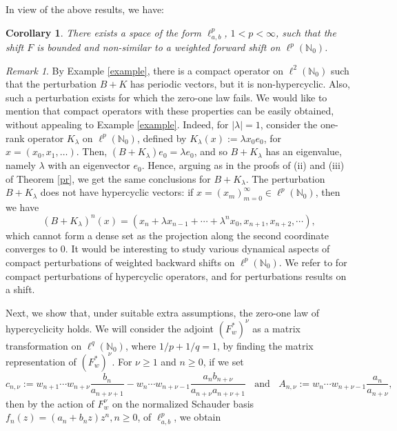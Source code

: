 \documentclass[12pt, reqno]{amsart}
\newtheorem{corollary}[theorem]{Corollary}
\theoremstyle{definition}
\theoremstyle{remark}
\newtheorem{remark}[theorem]{Remark}
\numberwithin{equation}{section}
\begin{document}
In view of the above results, we have:

\begin{corollary}
There exists a space of the form $\ell^p_{a,b}$, $1<p<\infty$, such that the shift $F$ is bounded and non-similar to a weighted forward shift on $\ell^p(\mathbb{N}_0)$.
\end{corollary}


 \begin{remark}
      By Example \ref{example}, there is a compact operator on $\ell^2(\mathbb{N}_{0})$ such that the perturbation $B+K$ has periodic vectors, but it is non-hypercyclic. Also, such a perturbation exists for which the zero-one law fails. We would like to mention that compact operators with these properties can be easily obtained, without appealing to Example \ref{example}. Indeed, for $|\lambda|=1$, consider the one-rank operator $K_{\lambda}$ on $\ell^p(\mathbb{N}_{0})$, defined by $K_{\lambda}(x):=\lambda x_0e_0$, for $x=(x_0,x_1,\ldots)$. Then, $(B+K_{\lambda})e_0=\lambda e_0$, and so $B+K_{\lambda}$ has an eigenvalue, namely $\lambda$ with an eigenvector $e_0$. Hence, arguing as in the proofs of  (ii) and (iii) of Theorem \ref{pr}, we get the same conclusions for $B+K_{\lambda}$. The perturbation $B+K_{\lambda}$ does not have hypercyclic vectors: if $x=(x_m)_{m=0}^{\infty}\in\ell^p(\mathbb{N}_{0})$, then we have 
      \[
      (B+K_{\lambda})^n(x)=(x_n+\lambda x_{n-1}+\cdots+\lambda^n x_0, x_{n+1},x_{n+2},\cdots),
      \]
      which cannot form a dense set as the projection along the second coordinate converges to $0$. It would be interesting to study various dynamical aspects of compact perturbations of weighted backward shifts on $\ell^p(\mathbb{N}_{0})$. We refer to \cite{Herrero} for compact perturbations of hypercyclic operators, and \cite{Stampfli} for perturbations results on a shift.
  \end{remark}
Next, we show that, under suitable extra assumptions, the zero-one law of hypercyclicity holds. We will consider the adjoint $(F_w^{*})^{\nu}$ as a matrix transformation on $\ell^q(\mathbb{N}_{0})$, where $1/p+1/q=1$, by finding the matrix representation of $(F_w^{*})^{\nu}$. For $\nu\geq 1$ and $n\geq 0$, if we set
    \[
    c_{n,\nu}:=w_{n+1}\cdots w_{n+\nu}\frac{b_{n}}{a_{n+\nu+1}}-w_{n}\cdots w_{n+\nu-1}\frac{a_{n}b_{n+\nu}}{a_{n+\nu}a_{n+\nu+1}}~~~~\text{and}~~~~A_{n,\nu}:=w_{n}\cdots w_{n+\nu-1}\frac{a_{n}}{a_{n+\nu}},
    \]
    then by the action of $F_{w}^{\nu}$ on the normalized Schauder basis $f_{n}(z) =(a_{n}+b_{n}z)z^{n},n \geq 0$, of $\ell^{p}_{a,b}$, we obtain 
\end{document}
